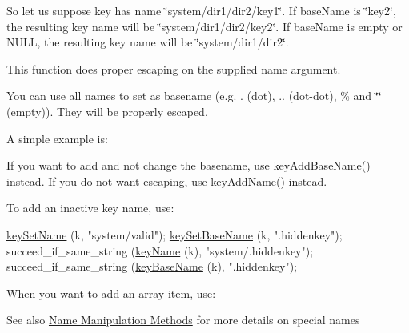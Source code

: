 So let us suppose {\ttfamily key} has name {\ttfamily \char`\"{}system/dir1/dir2/key1\char`\"{}}. If {\ttfamily base\+Name} is {\ttfamily \char`\"{}key2\char`\"{}}, the resulting key name will be {\ttfamily \char`\"{}system/dir1/dir2/key2\char`\"{}}. If {\ttfamily base\+Name} is empty or N\+U\+LL, the resulting key name will be {\ttfamily \char`\"{}system/dir1/dir2\char`\"{}}.

This function does proper escaping on the supplied name argument.

You can use all names to set as basename (e.\+g. . (dot), .. (dot-\/dot), \% and \char`\"{}\char`\"{} (empty)). They will be properly escaped.

A simple example is\+: 
\begin{DoxyCodeInclude}
\end{DoxyCodeInclude}
 If you want to add and not change the basename, use \hyperlink{group__keyname_gaa942091fc4bd5c2699e49ddc50829524}{key\+Add\+Base\+Name()} instead. If you do not want escaping, use \hyperlink{group__keyname_gaa70593a2c772c4b7bc33423b9b10a270}{key\+Add\+Name()} instead.

To add an inactive key name, use\+: 
\begin{DoxyCodeInclude}
        \hyperlink{group__keyname_ga7699091610e7f3f43d2949514a4b35d9}{keySetName} (k, \textcolor{stringliteral}{"system/valid"});
        \hyperlink{group__keyname_ga6e804bd453f98c28b0ff51430d1df407}{keySetBaseName} (k, \textcolor{stringliteral}{".hiddenkey"});
        succeed\_if\_same\_string (\hyperlink{group__keyname_ga8e805c726a60da921d3736cda7813513}{keyName} (k), \textcolor{stringliteral}{"system/.hiddenkey"});
        succeed\_if\_same\_string (\hyperlink{group__keyname_gaaff35e7ca8af5560c47e662ceb9465f5}{keyBaseName} (k), \textcolor{stringliteral}{".hiddenkey"});
\end{DoxyCodeInclude}
 When you want to add an array item, use\+: 
 \begin{DoxySeeAlso}{See also}
\hyperlink{group__keyname}{Name Manipulation Methods} for more details on special names
\end{DoxySeeAlso}

